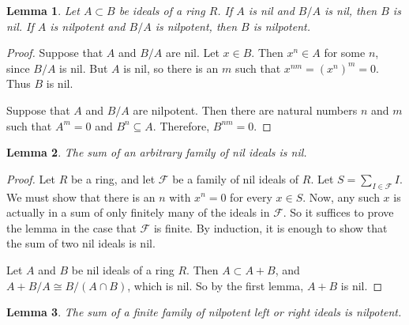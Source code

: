 \documentclass[12pt]{article}
\newtheorem{lemma}{Lemma}
\newcommand{\famf}{\mathcal{F}}
\begin{document}

\begin{lemma}
Let $A \subset B$ be ideals of a ring $R$.  If $A$ is nil and $B/A$ is nil, then $B$ is nil.  If $A$ is nilpotent and $B/A$ is nilpotent, then $B$ is nilpotent.
\end{lemma}

\begin{proof}
Suppose that $A$ and $B/A$ are nil.  Let $x \in B$.  Then $x^n \in A$ for some $n$, since $B/A$ is nil.  But $A$ is nil, so there is an $m$ such that $x^{nm} = (x^n)^m = 0$.  Thus $B$ is nil.

Suppose that $A$ and $B/A$ are nilpotent.  Then there are natural numbers $n$ and $m$ such that $A^m  = 0$ and $B^n \subseteq A$.  Therefore, $B^{nm} = 0$.
\end{proof}


\begin{lemma}
The sum of an arbitrary family of nil ideals is nil.
\end{lemma}

\begin{proof}
Let $R$ be a ring, and let $\famf$ be a family of nil ideals of $R$.  Let $S = \sum_{I \in \famf} I$.  We must show that there is an $n$ with $x^n = 0$ for every $x \in S$.  Now, any such $x$ is actually in a sum of only finitely many of the ideals in $\famf$.  So it suffices to prove the lemma in the case that $\famf$ is finite.  By induction, it is enough to show that the sum of two nil ideals is nil.

Let $A$ and $B$ be nil ideals of a ring $R$.  Then $A \subset A + B$, and $A+B/A \cong B/(A \cap B)$, which is nil.  So by the first lemma, $A + B$ is nil.
\end{proof}

\begin{lemma}
The sum of a finite family of nilpotent left or right ideals is nilpotent.
\end{lemma}
\end{document}
